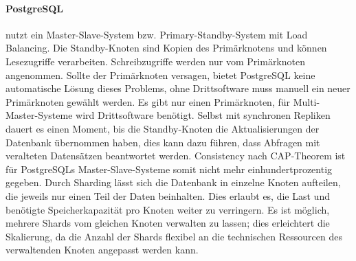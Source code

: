 \paragraph{PostgreSQL} nutzt ein Master-Slave-System bzw. Primary-Standby-System mit Load Balancing.\cite{PG6} Die Standby-Knoten sind Kopien des Primärknotens und können Lesezugriffe verarbeiten. Schreibzugriffe werden nur vom Primärknoten angenommen. Sollte der Primärknoten versagen, bietet PostgreSQL keine automatische Lösung dieses Problems, ohne Drittsoftware muss manuell ein neuer Primärknoten gewählt werden. Es gibt nur einen Primärknoten, für Multi-Master-Systeme wird Drittsoftware benötigt. Selbst mit synchronen Repliken dauert es einen Moment, bis die Standby-Knoten die Aktualisierungen der Datenbank übernommen haben, dies kann dazu führen, dass Abfragen mit veralteten Datensätzen beantwortet werden.\cite{PG8} Consistency nach CAP-Theorem ist für PostgreSQLs Master-Slave-Systeme somit nicht mehr einhundertprozentig gegeben.
Durch Sharding lässt sich die Datenbank in einzelne Knoten aufteilen, die jeweils nur einen Teil der Daten beinhalten. Dies erlaubt es, die Last und benötigte Speicherkapazität pro Knoten weiter zu verringern. Es ist möglich, mehrere Shards vom gleichen Knoten verwalten zu lassen; dies erleichtert die Skalierung, da die Anzahl der Shards flexibel an die technischen Ressourcen des verwaltenden Knoten angepasst werden kann.
